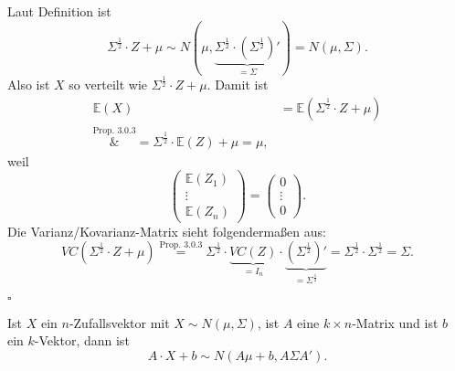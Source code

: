 \documentclass[10pt]{article}
\newcommand{\EW}{\mathbb{E}} %
\newcommand{\halb}{\frac{1}{2}} %
\newenvironment{BWS}[1][]
{\begin{Beweis}[frametitle=#1]}{\end{Beweis}}
\begin{document}
			\begin{BWS}[Beweis 4.0.1 (Varianz/Kovarianz-Matrix)]
				Laut Definition ist
				\begin{equation*}
					\Sigma^{\halb} \cdot Z + \mu \sim N(\mu, \underbrace{\Sigma^{\halb} \cdot (\Sigma^{\halb})'}_{= \Sigma}) = N(\mu, \Sigma).
				\end{equation*}
				Also ist $X$ so verteilt wie $\Sigma^{\halb} \cdot Z + \mu$. 
				Damit ist
				\begin{equation*}
					\begin{split}
						\EW(X) &= \EW(\Sigma^{\halb} \cdot Z + \mu)\\
						\overset{\text{Prop. 3.0.3}}&{=} \Sigma^{\halb} \cdot \EW(Z) + \mu = \mu,
					\end{split}
				\end{equation*}
				weil 
				\begin{equation*}
					\left(
					\begin{array}{c}
						\EW(Z_1)\\
						\vdots\\
						\EW(Z_n)
					\end{array}
					\right) = \left(
					\begin{array}{c}
						0\\
						\vdots\\
						0
					\end{array}
					\right).
				\end{equation*}
				Die Varianz/Kovarianz-Matrix sieht folgendermaßen aus:
				\begin{equation*}
					VC(\Sigma^{\halb} \cdot Z + \mu) \overset{\text{Prop. 3.0.3}}{=} \Sigma^{\halb} \cdot \underbrace{VC(Z)}_{= I_n} \cdot \underbrace{(\Sigma^{\halb})'}_{=\Sigma^{\halb}} = \Sigma^{\halb} \cdot \Sigma^{\halb} = \Sigma.
				\end{equation*}
				\begin{flushright}
					$\square$
				\end{flushright}
			\end{BWS}
			\begin{Proposition}
				Ist $X$ ein $n$-Zufallsvektor mit $X \sim N(\mu,\Sigma)$, ist $A$ eine $k \times n$-Matrix und ist $b$ ein $k$-Vektor, dann ist
				\begin{equation*}
					A \cdot X + b \sim N(A\mu + b, A \Sigma A').
				\end{equation*}
			\end{Proposition}
\end{document}
